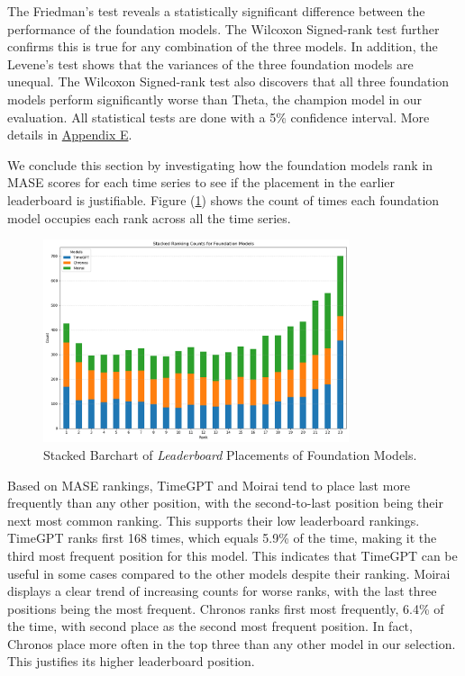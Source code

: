\documentclass[12pt,a4paper]{article}
\begin{document}
The Friedman’s test reveals a statistically significant difference between the performance of the foundation models. The Wilcoxon Signed-rank test further confirms this is true for any combination of the three models. In addition, the Levene’s test shows that the variances of the three foundation models are unequal. The Wilcoxon Signed-rank test also discovers that all three foundation models perform significantly worse than Theta, the champion model in our evaluation. All statistical tests are done with a 5\% confidence interval. More details in \hyperref[appendix_e]{Appendix E}.

We conclude this section by investigating how the foundation models rank in MASE scores for each time series to see if the placement in the earlier leaderboard is justifiable. Figure (\ref{stacked_ranking_count}) shows the count of times each foundation model occupies each rank across all the time series.

\begin{figure}[htbp]
  \centering
  \includegraphics[width=0.8\textwidth]{real_stacked_counts.png}
  \caption{Stacked Barchart of \textit{Leaderboard} Placements of Foundation Models.}
  \label{stacked_ranking_count}
\end{figure}

Based on MASE rankings, TimeGPT and Moirai tend to place last more frequently than any other position, with the second-to-last position being their next most common ranking. This supports their low leaderboard rankings. TimeGPT ranks first 168 times, which equals 5.9\% of the time, making it the third most frequent position for this model. This indicates that TimeGPT can be useful in some cases compared to the other models despite their ranking. Moirai displays a clear trend of increasing counts for worse ranks, with the last three positions being the most frequent. Chronos ranks first most frequently, 6.4\% of the time, with second place as the second most frequent position. In fact, Chronos place more often in the top three than any other model in our selection. This justifies its higher leaderboard position. 
\end{document}
